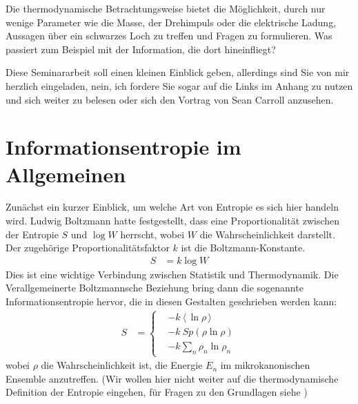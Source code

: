 \documentclass[ngerman]{scrartcl}
\newcommand{\erw}[1]{\langle {#1} \rangle}
\begin{document}
Die thermodynamische Betrachtungsweise bietet die Möglichkeit, durch nur wenige Parameter wie die Masse, der Drehimpuls oder die elektrische Ladung, Aussagen über ein schwarzes Loch zu treffen und Fragen zu formulieren. Was passiert zum Beispiel mit der Information, die dort hineinfliegt?

Diese Seminararbeit soll einen kleinen Einblick geben, allerdings sind Sie von mir herzlich eingeladen, nein, ich fordere Sie sogar auf die Links im Anhang zu nutzen und sich weiter zu belesen oder sich den Vortrag von Sean Carroll \cite{SeanCarrollVortrag} anzusehen.  

\section{Informationsentropie im Allgemeinen} \label{InfoentropieAllg}
Zunächst ein kurzer Einblick, um welche Art von Entropie es sich hier handeln wird. Ludwig Boltzmann hatte festgestellt, dass eine Proportionalität zwischen der Entropie $S$ und $\log W$ herrscht, wobei $W$ die Wahrscheinlichkeit darstellt. Der zugehörige Proportionalitätsfaktor $k$ ist die Boltzmann-Konstante.
	\begin{align}
		S &= k \log W
	\end{align}
Dies ist eine wichtige Verbindung zwischen Statistik und Thermodynamik. 
Die Verallgemeinerte Boltzmannsche Beziehung bring dann die sogenannte Informationsentropie hervor, die in diesen Gestalten geschrieben werden kann:	
	\begin{align} \label{Informationsentropie}
		S &=
		\left\{
		\begin{aligned}
		&- k ~\erw{\,\ln \rho\,} \\
		&-k~ Sp(\rho \ln \rho) \\
		&-k \sum_n \rho_n \ln \rho_n
		\end{aligned}
		\right.
	\end{align}
wobei $\rho$ die Wahrscheinlichkeit ist, die Energie $E_n$ im mikrokanonischen Ensemble anzutreffen. 
(Wir wollen hier nicht weiter auf die thermodynamische Definition der Entropie eingehen, für Fragen zu den Grundlagen siehe \cite{Brenig})
\end{document}

